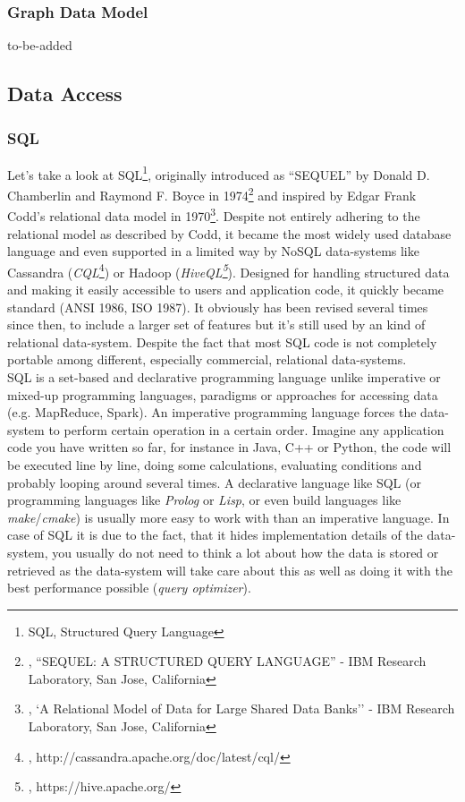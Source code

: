 {\subsubsection{Graph Data Model}
\label{tf_dma_datamodels_gdm}
to-be-added
\newpage
\subsection{Data Access}
\label{tf_dma_dataaccess}

\subsubsection{SQL}
\label{tf_dma_dataaccess_sql}

Let's take a look at SQL\footnote{SQL, Structured Query Language}, originally introduced as ``SEQUEL'' by Donald D. Chamberlin and Raymond F. Boyce in 1974\footnote{\cite{SQLIBM}, ``SEQUEL: A STRUCTURED QUERY LANGUAGE'' - IBM Research Laboratory, San Jose, California} and inspired by Edgar Frank Codd's relational data model in 1970\footnote{\cite{CODDRDM}, `A Relational Model of Data for Large Shared Data Banks'' - IBM Research Laboratory, San Jose, California}. Despite not entirely adhering to the relational model as described by Codd, it became the most widely used database language and even supported in a limited way by NoSQL data-systems like Cassandra (\textit{CQL}\footnote{\cite{CQL}, http://cassandra.apache.org/doc/latest/cql/}) or Hadoop (\textit{HiveQL\footnote{\cite{AHW}, https://hive.apache.org/}}).
Designed for handling structured data and making it easily accessible to users and application code, it quickly became standard (ANSI 1986, ISO 1987). It obviously has been revised several times since then, to include a larger set of features but it's still used by an kind of relational data-system. Despite the fact that most SQL code is not completely portable among different, especially commercial, relational data-systems.\\
SQL is a set-based and declarative programming language unlike imperative or mixed-up programming languages, paradigms or approaches for accessing data (e.g. MapReduce, Spark). An imperative programming language forces the data-system to perform certain operation in a certain order. Imagine any application code you have written so far, for instance in Java, C++ or Python, the code will be executed line by line, doing some calculations, evaluating conditions and probably looping around several times. A declarative language like SQL (or programming languages like \textit{Prolog} or \textit{Lisp}, or even build languages like \textit{make}/\textit{cmake}) is usually more easy to work with than an imperative language. In case of SQL it is due to the fact, that it hides implementation details of the data-system, you usually do not need to think a lot about how the data is stored or retrieved as the data-system will take care about this as well as doing it with the best performance possible (\textit{query optimizer}).
}

